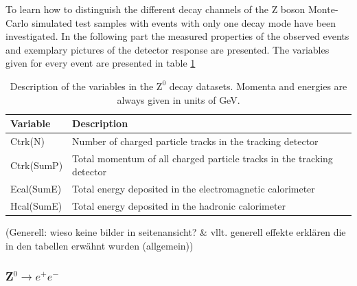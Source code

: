\documentclass[11pt, a4paper]{article}
\numberwithin{equation}{section}
\newcommand{\korr}[1]{{\color{red}(#1)}}
\begin{document}
To learn how to distinguish the different decay channels of the Z boson Monte-Carlo simulated test samples with events with only one decay mode have been investigated.
In the following part the measured properties of the observed events and exemplary pictures of the detector response are presented.
The variables given for every event are presented in table \ref{tab:desc_variables_tag1}
\begin{table}[H]
	\centering
	\begin{tabularx}{0.9\textwidth}{lX}
		\toprule
		\textbf{Variable} & \textbf{Description} \\
		\midrule		
		Ctrk(N) 	& Number of charged particle tracks in the tracking detector \\
		Ctrk(SumP) 	& Total momentum of all charged particle tracks in the tracking detector \\
		Ecal(SumE)	& Total energy deposited in the electromagnetic calorimeter \\
		Hcal(SumE)	& Total energy deposited in the hadronic calorimeter \\
		\bottomrule
	\end{tabularx}
	\caption{Description of the variables in the $\mathrm{Z}^0$ decay datasets. Momenta and energies are always given in units of GeV.}
	\label{tab:desc_variables_tag1}
\end{table}
\korr{Generell: wieso keine bilder in seitenansicht? \& vllt. generell effekte erklären die in den tabellen erwähnt wurden (allgemein)}

\clearpage
\subsubsection{Z$^0\rightarrow e^+e^-$}
\end{document}
